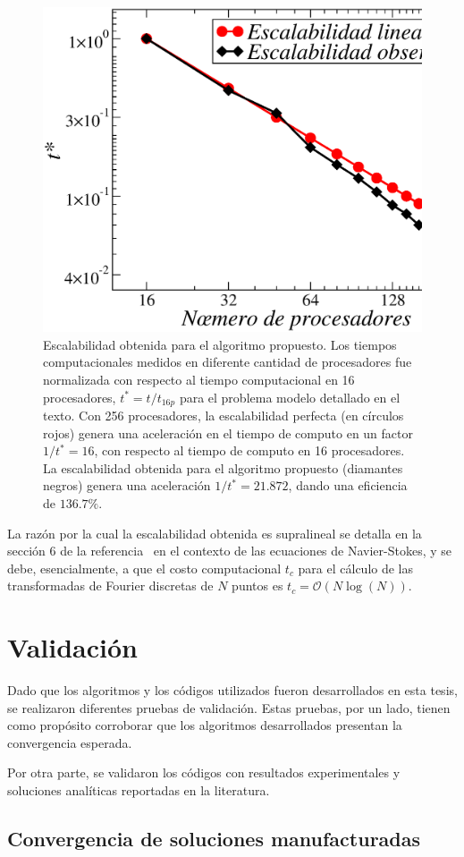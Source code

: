 \begin{figure}[h!]
\centering
  \includegraphics[width=0.5\linewidth]{figuras/escalabilidad.eps}
  \caption{Escalabilidad obtenida para el algoritmo propuesto. 
  Los tiempos computacionales medidos en diferente cantidad 
  de procesadores fue normalizada con respecto al tiempo computacional 
  en 16 procesadores, $t^*=t/t_{16p}$ para 
  el problema modelo detallado en el texto. 
  Con 256 procesadores, la escalabilidad perfecta (en círculos rojos) 
  genera una aceleración en el tiempo de computo en un factor $1/t^*=16$, 
  con respecto al tiempo de computo en 16 procesadores. 
  La escalabilidad obtenida para el algoritmo propuesto 
  (diamantes negros) genera una aceleración $1/t^*=21.872$, dando 
 una eficiencia de $136.7\%$. 
}
 \label{fig:scala}
\end{figure}

La razón por la cual la escalabilidad obtenida es supralineal se detalla 
en la sección 6 de la referencia~\cite{Albin2011} en el contexto de las ecuaciones de 
Navier-Stokes, y se debe, esencialmente, a que el costo 
computacional $t_c$ para el cálculo de las transformadas de Fourier discretas de $N$ puntos es $t_c=\mathcal{O}(N\log(N))$.

\section{Validación}

Dado que los algoritmos y los códigos utilizados fueron desarrollados en 
esta tesis, se realizaron diferentes pruebas de validación. Estas pruebas, 
por un lado, tienen como propósito corroborar que los algoritmos 
desarrollados presentan la convergencia esperada. 

Por otra parte, se validaron los códigos con resultados experimentales 
y soluciones analíticas reportadas en la literatura.

\subsection{Convergencia de soluciones manufacturadas}
\label{sec:manufacturada}

